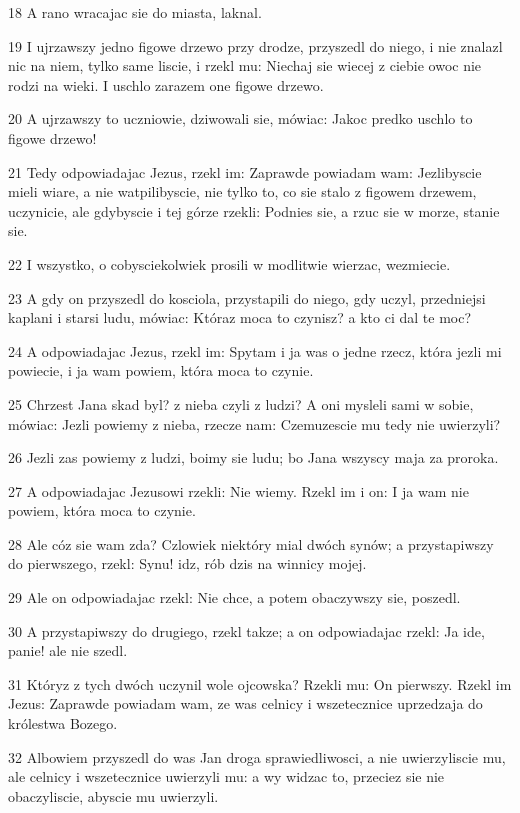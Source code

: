 \par 18 A rano wracajac sie do miasta, laknal.
\par 19 I ujrzawszy jedno figowe drzewo przy drodze, przyszedl do niego, i nie znalazl nic na niem, tylko same liscie, i rzekl mu: Niechaj sie wiecej z ciebie owoc nie rodzi na wieki. I uschlo zarazem one figowe drzewo.
\par 20 A ujrzawszy to uczniowie, dziwowali sie, mówiac: Jakoc predko uschlo to figowe drzewo!
\par 21 Tedy odpowiadajac Jezus, rzekl im: Zaprawde powiadam wam: Jezlibyscie mieli wiare, a nie watpilibyscie, nie tylko to, co sie stalo z figowem drzewem, uczynicie, ale gdybyscie i tej górze rzekli: Podnies sie, a rzuc sie w morze, stanie sie.
\par 22 I wszystko, o cobysciekolwiek prosili w modlitwie wierzac, wezmiecie.
\par 23 A gdy on przyszedl do kosciola, przystapili do niego, gdy uczyl, przedniejsi kaplani i starsi ludu, mówiac: Któraz moca to czynisz? a kto ci dal te moc?
\par 24 A odpowiadajac Jezus, rzekl im: Spytam i ja was o jedne rzecz, która jezli mi powiecie, i ja wam powiem, która moca to czynie.
\par 25 Chrzest Jana skad byl? z nieba czyli z ludzi? A oni mysleli sami w sobie, mówiac: Jezli powiemy z nieba, rzecze nam: Czemuzescie mu tedy nie uwierzyli?
\par 26 Jezli zas powiemy z ludzi, boimy sie ludu; bo Jana wszyscy maja za proroka.
\par 27 A odpowiadajac Jezusowi rzekli: Nie wiemy. Rzekl im i on: I ja wam nie powiem, która moca to czynie.
\par 28 Ale cóz sie wam zda? Czlowiek niektóry mial dwóch synów; a przystapiwszy do pierwszego, rzekl: Synu! idz, rób dzis na winnicy mojej.
\par 29 Ale on odpowiadajac rzekl: Nie chce, a potem obaczywszy sie, poszedl.
\par 30 A przystapiwszy do drugiego, rzekl takze; a on odpowiadajac rzekl: Ja ide, panie! ale nie szedl.
\par 31 Któryz z tych dwóch uczynil wole ojcowska? Rzekli mu: On pierwszy. Rzekl im Jezus: Zaprawde powiadam wam, ze was celnicy i wszetecznice uprzedzaja do królestwa Bozego.
\par 32 Albowiem przyszedl do was Jan droga sprawiedliwosci, a nie uwierzyliscie mu, ale celnicy i wszetecznice uwierzyli mu: a wy widzac to, przeciez sie nie obaczyliscie, abyscie mu uwierzyli.
